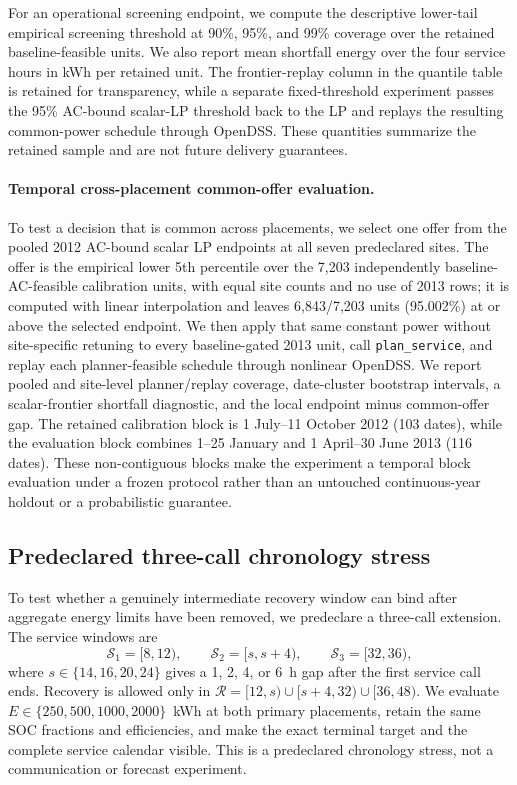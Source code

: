 \documentclass[11pt]{article}
\begin{document}
For an operational screening endpoint, we compute the descriptive lower-tail empirical screening threshold at 90\%, 95\%, and 99\% coverage over the retained baseline-feasible units. We also report mean shortfall energy over the four service hours in kWh per retained unit. The frontier-replay column in the quantile table is retained for transparency, while a separate fixed-threshold experiment passes the 95\% AC-bound scalar-LP threshold back to the LP and replays the resulting common-power schedule through OpenDSS. These quantities summarize the retained sample and are not future delivery guarantees.

\paragraph{Temporal cross-placement common-offer evaluation.} To test a decision that is common across placements, we select one offer from the pooled 2012 AC-bound scalar LP endpoints at all seven predeclared sites. The offer is the empirical lower 5th percentile over the 7,203 independently baseline-AC-feasible calibration units, with equal site counts and no use of 2013 rows; it is computed with linear interpolation and leaves 6,843/7,203 units (95.002\%) at or above the selected endpoint. We then apply that same constant power without site-specific retuning to every baseline-gated 2013 unit, call \texttt{plan\_service}, and replay each planner-feasible schedule through nonlinear OpenDSS. We report pooled and site-level planner/replay coverage, date-cluster bootstrap intervals, a scalar-frontier shortfall diagnostic, and the local endpoint minus common-offer gap. The retained calibration block is 1 July--11 October 2012 (103 dates), while the evaluation block combines 1--25 January and 1 April--30 June 2013 (116 dates). These non-contiguous blocks make the experiment a temporal block evaluation under a frozen protocol rather than an untouched continuous-year holdout or a probabilistic guarantee.


\subsection{Predeclared three-call chronology stress}
To test whether a genuinely intermediate recovery window can bind after aggregate energy limits have been removed, we predeclare a three-call extension. The service windows are
\[
\mathcal S_1=[8,12),\qquad \mathcal S_2=[s,s+4),\qquad
\mathcal S_3=[32,36),
\]
where \(s\in\{14,16,20,24\}\) gives a 1, 2, 4, or 6~h gap after the first service call ends. Recovery is allowed only in \(\mathcal R=[12,s)\cup[s+4,32)\cup[36,48)\). We evaluate \(E\in\{250,500,1000,2000\}\)~kWh at both primary placements, retain the same SOC fractions and efficiencies, and make the exact terminal target and the complete service calendar visible. This is a predeclared chronology stress, not a communication or forecast experiment.
\end{document}
